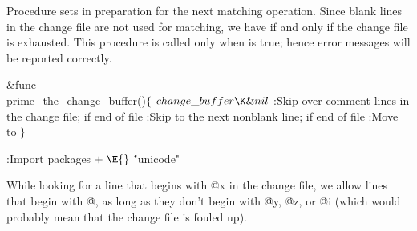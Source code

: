 \vskip6pt
\begingroup \def\tt{\eighttt} \baselineskip9pt
\verbatim

Procedure 
sets  in preparation for the next matching operation.
Since blank lines in the change file are not used for matching, we have
 if and only if
the change file is exhausted. This procedure is called only when
 is true; hence error messages will be reported correctly.

\Y\B\&{func}\5
\\{prime\_the\_change\_buffer}()${}\{{}$\1\6
${}\\{change\_buffer}\K\&{nil}{}$\6
:Skip over comment lines in the change file;  if end of file%
\X\6
:Skip to the next nonblank line;  if end of file\X\6
:Move  to \X\2\6
${}\}{}$\Y\par
\fi

\B{}:Import packages\X${}\mathrel+\E{}$\6
\.{"unicode"}\par
\fi

While looking for a line that begins with \.{@x} in the change file, we
allow lines that begin with \.{@}, as long as they don't begin with \.{@y},
\.{@z}, or \.{@i} (which would probably mean that the change file is fouled up).

